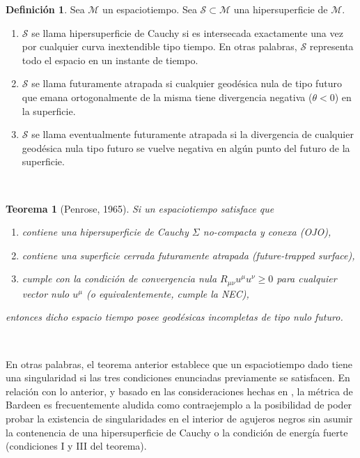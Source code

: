 \documentclass{article}
\numberwithin{equation}{section}
\newtheorem{theorem}{Teorema}[section]
\theoremstyle{definition}
\newtheorem{definition}{Definición}[section]
\begin{document}
\theoremstyle{definition}
\begin{definition}
	Sea $\mathcal{M}$ un espaciotiempo. Sea $\mathcal{S} \subset \mathcal{M}$ una hipersuperficie de $\mathcal{M}$.
	\begin{enumerate}[i]
		\item $\mathcal{S}$ se llama hipersuperficie de Cauchy si es intersecada exactamente una vez por cualquier curva inextendible tipo tiempo. En otras palabras, $\mathcal{S}$ representa todo el espacio en un instante de tiempo. 
		
		\item $\mathcal{S}$ se llama futuramente atrapada si cualquier geodésica nula de tipo futuro que emana ortogonalmente de la misma tiene divergencia negativa ($\theta < 0$) en la superficie.
		
		\item $\mathcal{S}$ se llama eventualmente futuramente atrapada si la divergencia de cualquier geodésica nula tipo futuro se vuelve negativa en algún punto del futuro de la superficie.
	\end{enumerate}
\end{definition}
\
\begin{theorem}[Penrose, 1965]
\label{penrose sing thm}
Si un espaciotiempo satisface que

\begin{enumerate}[i]
\item contiene una hipersuperficie de Cauchy $\Sigma$ no-compacta y conexa (OJO),

\item contiene una superficie cerrada futuramente atrapada (future-trapped surface),

\item cumple con la condición de convergencia nula $R_{\mu \nu}u^{\mu}u^{\nu} \geq 0$ para cualquier vector nulo $u^{\mu}$ (o equivalentemente, cumple la NEC),
\end{enumerate}

entonces dicho espacio tiempo posee geodésicas incompletas de tipo nulo futuro.
\end{theorem}
\

En otras palabras, el teorema anterior establece que un espaciotiempo dado tiene una singularidad si las tres condiciones enunciadas previamente se satisfacen. En relación con lo anterior, y basado en las consideraciones hechas en \cite{borde1994,borde1996}, la métrica de Bardeen es frecuentemente aludida como contraejemplo a la posibilidad de poder probar la existencia de singularidades en el interior de agujeros negros sin asumir la contenencia de una hipersuperficie de Cauchy o la condición de energía fuerte (condiciones I y III del teorema).\\
\end{document}
